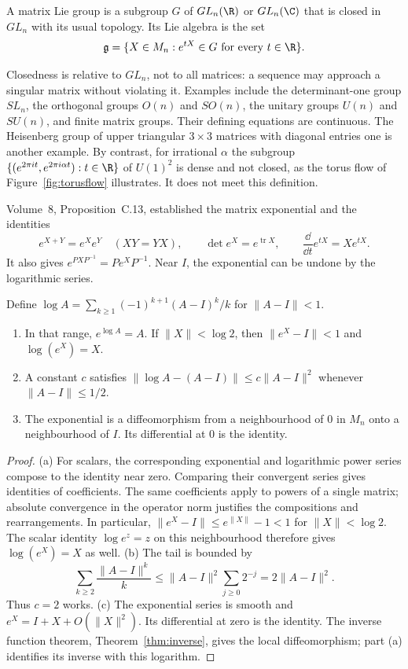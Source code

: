 \begin{definition}
A matrix Lie group is a subgroup $G$ of $GL_n(\R)$ or $GL_n(\C)$
that is closed in $GL_n$ with its usual topology.
Its Lie algebra is the set
\[
 \mathfrak g=\{X\in M_n:e^{tX}\in G\text{ for every }t\in\R\}.
\]
\end{definition}

Closedness is relative to $GL_n$, not to all matrices: a sequence may
approach a singular matrix without violating it.
Examples include the determinant-one group $SL_n$, the orthogonal groups
$O(n)$ and $SO(n)$, the unitary groups $U(n)$ and $SU(n)$, and finite
matrix groups. Their defining equations are continuous.
The Heisenberg group of upper triangular $3\times3$ matrices with diagonal
entries one is another example.
By contrast, for irrational $\alpha$ the subgroup
$\{(e^{2\pi it},e^{2\pi i\alpha t}):t\in\R\}$ of $U(1)^2$ is dense
and not closed, as the torus flow of Figure~\ref{fig:torusflow} illustrates.
It does not meet this definition.

Volume~8, Proposition~C.13, established the matrix exponential and the
identities
\[
 e^{X+Y}=e^Xe^Y\quad(XY=YX),\qquad
 \det e^X=e^{\operatorname{tr}X},\qquad
 \frac{\dd}{\dd t}e^{tX}=Xe^{tX}.
\]
It also gives $e^{PXP^{-1}}=Pe^XP^{-1}$.
Near $I$, the exponential can be undone by the logarithmic series.

\begin{lemma}\label{lem:log}
Define $\log A=\sum_{k\ge1}(-1)^{k+1}(A-I)^k/k$ for $\|A-I\|<1$.
\begin{enumerate}
\item[(a)] In that range, $e^{\log A}=A$.
If $\|X\|<\log2$, then $\|e^X-I\|<1$ and $\log(e^X)=X$.
\item[(b)] A constant $c$ satisfies
$\|\log A-(A-I)\|\le c\|A-I\|^2$ whenever $\|A-I\|\le1/2$.
\item[(c)] The exponential is a diffeomorphism from a neighbourhood of $0$
in $M_n$ onto a neighbourhood of $I$. Its differential at $0$ is the identity.
\end{enumerate}
\end{lemma}
\begin{proof}
(a) For scalars, the corresponding exponential and logarithmic power
series compose to the identity near zero. Comparing their convergent
series gives identities of coefficients. The same coefficients apply
to powers of a single matrix; absolute convergence in the operator norm
justifies the compositions and rearrangements.
In particular,
$\|e^X-I\|\le e^{\|X\|}-1<1$ for $\|X\|<\log2$.
The scalar identity $\log e^z=z$ on this neighbourhood therefore gives
$\log(e^X)=X$ as well.
(b) The tail is bounded by
\[
 \sum_{k\ge2}\frac{\|A-I\|^k}{k}
 \le\|A-I\|^2\sum_{j\ge0}2^{-j}=2\|A-I\|^2.
\]
Thus $c=2$ works.
(c) The exponential series is smooth and
$e^X=I+X+O(\|X\|^2)$. Its differential at zero is the identity.
The inverse function theorem, Theorem~\ref{thm:inverse}, gives the local
diffeomorphism; part (a) identifies its inverse with this logarithm.
\end{proof}


